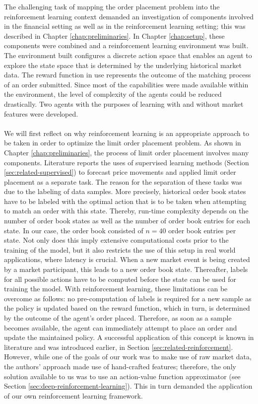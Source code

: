     The challenging task of mapping the order placement problem into the reinforcement learning context demanded an investigation of components involved in the financial setting as well as in the reinforcement learning setting; this was described in Chapter \ref{chap:preliminaries}.
    In Chapter \ref{chap:setup}, these components were combined and a reinforcement learning environment was built.
    The environment built configures a discrete action space that enables an agent to explore the state space that is determined by the underlying historical market data.
    The reward function in use represents the outcome of the matching process of an order submitted.
    Since most of the capabilities were made available within the environment, the level of complexity of the agents could be reduced drastically.
    Two agents with the purposes of learning with and without market features were developed.
    \\
    \\
    We will first reflect on why reinforcement learning is an appropriate approach to be taken in order to optimize the limit order placement problem.
    As shown in Chapter \ref{chap:preliminaries}, the process of limit order placement involves many components.
    Literature reports the uses of supervised learning methods (Section \ref{sec:related-supervised}) to forecast price movements and applied limit order placement as a separate task.
    The reason for the separation of these tasks was due to the labeling of data samples.
    More precisely, historical order book states have to be labeled with the optimal action that is to be taken when attempting to match an order with this state.
    Thereby, run-time complexity depends on the number of order book states as well as the number of order book entries for each state. In our case, the order book consisted of $n=40$ order book entries per state.
    Not only does this imply extensive computational costs prior to the training of the model, but it also restricts the use of this setup in real world applications, where latency is crucial.
    When a new market event is being created by a market participant, this leads to a new order book state. Thereafter, labels for all possible actions have to be computed before the state can be used for training the model.
    With reinforcement learning, these limitations can be overcome as follows: no pre-computation of labels is required for a new sample as the policy is updated based on the reward function, which in turn, is determined by the outcome of the agent's order placed.
    Therefore, as soon as a sample becomes available, the agent can immediately attempt to place an order and update the maintained policy.
    A successful application of this concept is known in literature\cite{nevmyvaka2006reinforcement} and was introduced earlier, in Section \ref{sec:related-reinforcement}.
    However, while one of the goals of our work was to make use of raw market data, the authors' approach made use of hand-crafted features;  therefore, the only solution available to us was to use an action-value function approximator (see Section \ref{sec:deep-reinforcement-learning}).
    This in turn demanded the application of our own reinforcement learning framework.
    
